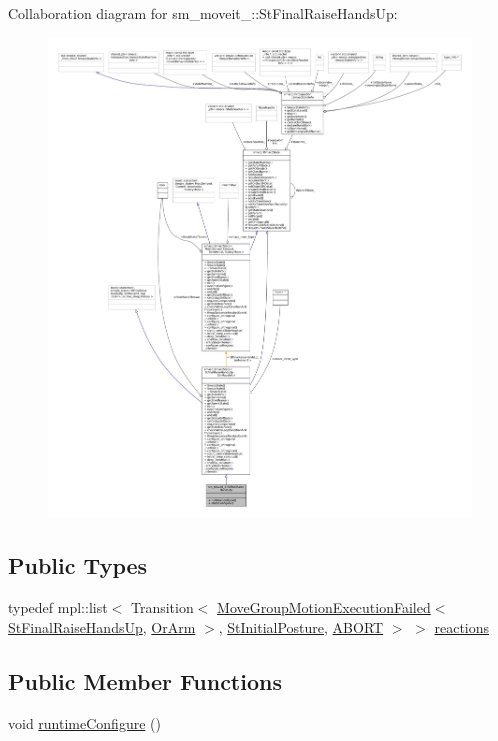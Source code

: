 Collaboration diagram for sm\+\_\+moveit\+\_\+:\+:St\+Final\+Raise\+Hands\+Up\+:
\nopagebreak
\begin{figure}[H]
\begin{center}
\leavevmode
\includegraphics[width=350pt]{structsm__moveit__4_1_1StFinalRaiseHandsUp__coll__graph}
\end{center}
\end{figure}
\subsection*{Public Types}
\begin{DoxyCompactItemize}
\item 
typedef mpl\+::list$<$ Transition$<$ \hyperlink{structmoveit__z__client_1_1MoveGroupMotionExecutionFailed}{Move\+Group\+Motion\+Execution\+Failed}$<$ \hyperlink{structsm__moveit__4_1_1StFinalRaiseHandsUp}{St\+Final\+Raise\+Hands\+Up}, \hyperlink{classsm__moveit__4_1_1OrArm}{Or\+Arm} $>$, \hyperlink{structsm__moveit__4_1_1StInitialPosture}{St\+Initial\+Posture}, \hyperlink{classABORT}{A\+B\+O\+RT} $>$ $>$ \hyperlink{structsm__moveit__4_1_1StFinalRaiseHandsUp_af12b19b5e2f0f5fc3bbe6e8cee4d9bb1}{reactions}
\end{DoxyCompactItemize}
\subsection*{Public Member Functions}
\begin{DoxyCompactItemize}
\item 
void \hyperlink{structsm__moveit__4_1_1StFinalRaiseHandsUp_abf2c776a0c87aca2f9bae83228f5c5a2}{runtime\+Configure} ()
\end{DoxyCompactItemize}
